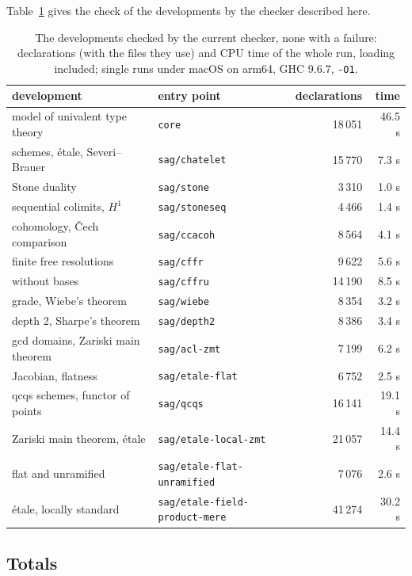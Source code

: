 \documentclass[11pt]{article}
\begin{document}
Table~\ref{tab:valid} gives the check of the developments by the
checker described here.
\begin{table}[ht]
\centering
\small
\begin{tabular}{llrr}
\toprule
development & entry point & declarations & time\\
\midrule
model of univalent type theory & \texttt{core} & 18\,051 & 46.5 s\\
schemes, \'etale, Severi--Brauer & \texttt{sag/chatelet} & 15\,770 & 7.3 s\\
Stone duality & \texttt{sag/stone} & 3\,310 & 1.0 s\\
sequential colimits, $H^1$ & \texttt{sag/stoneseq} & 4\,466 & 1.4 s\\
cohomology, \v{C}ech comparison & \texttt{sag/ccacoh} & 8\,564 & 4.1 s\\
finite free resolutions & \texttt{sag/cffr} & 9\,622 & 5.6 s\\
\quad without bases & \texttt{sag/cffru} & 14\,190 & 8.5 s\\
grade, Wiebe's theorem & \texttt{sag/wiebe} & 8\,354 & 3.2 s\\
depth 2, Sharpe's theorem & \texttt{sag/depth2} & 8\,386 & 3.4 s\\
gcd domains, Zariski main theorem & \texttt{sag/acl-zmt} & 7\,199 & 6.2 s\\
Jacobian, flatness & \texttt{sag/etale-flat} & 6\,752 & 2.5 s\\
qcqs schemes, functor of points & \texttt{sag/qcqs} & 16\,141 & 19.1 s\\
Zariski main theorem, \'etale & \texttt{sag/etale-local-zmt} & 21\,057 & 14.4 s\\
flat and unramified & \texttt{sag/etale-flat-unramified} & 7\,076 & 2.6 s\\
\'etale, locally standard & \texttt{sag/etale-field-product-mere} & 41\,274 & 30.2 s\\
\bottomrule
\end{tabular}
\caption{The developments checked by the current checker, none with a
  failure: declarations (with the files they use) and CPU time of the
  whole run, loading included; single runs under macOS on arm64, GHC 9.6.7,
  \texttt{-O1}.}
\label{tab:valid}
\end{table}

\subsection{Totals}
\end{document}

